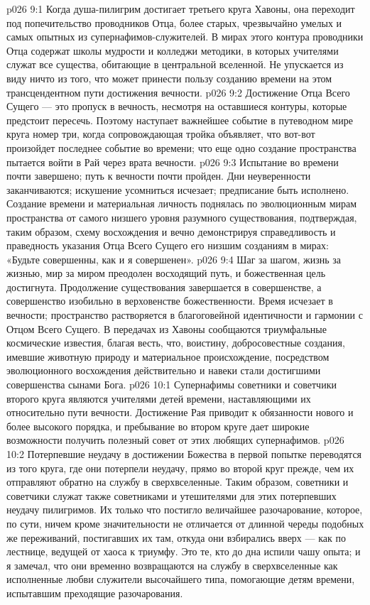 \vs p026 9:1 Когда душа\hyp{}пилигрим достигает третьего круга Хавоны, она переходит под попечительство проводников Отца, более старых, чрезвычайно умелых и самых опытных из супернафимов\hyp{}служителей. В мирах этого контура проводники Отца содержат школы мудрости и колледжи методики, в которых учителями служат все существа, обитающие в центральной вселенной. Не упускается из виду ничто из того, что может принести пользу созданию времени на этом трансцендентном пути достижения вечности.
\vs p026 9:2 Достижение Отца Всего Сущего --- это пропуск в вечность, несмотря на оставшиеся контуры, которые предстоит пересечь. Поэтому наступает важнейшее событие в путеводном мире круга номер три, когда сопровождающая тройка объявляет, что вот\hyp{}вот произойдет последнее событие во времени; что еще одно создание пространства пытается войти в Рай через врата вечности.
\vs p026 9:3 \pc Испытание во времени почти завершено; путь к вечности почти пройден. Дни неуверенности заканчиваются; искушение усомниться исчезает; предписание быть  исполнено. Создание времени и материальная личность поднялась по эволюционным мирам пространства от самого низшего уровня разумного существования, подтверждая, таким образом, схему восхождения и вечно демонстрируя справедливость и праведность указания Отца Всего Сущего его низшим созданиям в мирах: «Будьте совершенны, как и я совершенен».
\vs p026 9:4 Шаг за шагом, жизнь за жизнью, мир за миром преодолен восходящий путь, и божественная цель достигнута. Продолжение существования завершается в совершенстве, а совершенство изобильно в верховенстве божественности. Время исчезает в вечности; пространство растворяется в благоговейной идентичности и гармонии с Отцом Всего Сущего. В передачах из Хавоны сообщаются триумфальные космические известия, благая весть, что, воистину, добросовестные создания, имевшие животную природу и материальное происхождение, посредством эволюционного восхождения действительно и навеки стали достигшими совершенства сынами Бога.
\vs p026 10:1 Супернафимы советники и советчики второго круга являются учителями детей времени, наставляющими их относительно пути вечности. Достижение Рая приводит к обязанности нового и более высокого порядка, и пребывание во втором круге дает широкие возможности получить полезный совет от этих любящих супернафимов.
\vs p026 10:2 \pc Потерпевшие неудачу в достижении Божества в первой попытке переводятся из того круга, где они потерпели неудачу, прямо во второй круг прежде, чем их отправляют обратно на службу в сверхвселенные. Таким образом, советники и советчики служат также советниками и утешителями для этих потерпевших неудачу пилигримов. Их только что постигло величайшее разочарование, которое, по сути, ничем кроме значительности не отличается от длинной череды подобных же переживаний, постигавших их там, откуда они взбирались вверх --- как по лестнице, ведущей от хаоса к триумфу. Это те, кто до дна испили чашу опыта; и я замечал, что они временно возвращаются на службу в сверхвселенные как исполненные любви служители высочайшего типа, помогающие детям времени, испытавшим преходящие разочарования.
